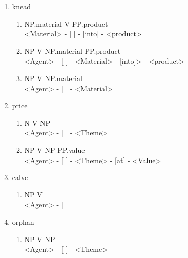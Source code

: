 \documentclass[11pt,a4paper,twocolumn]{article}
\begin{document}
\begin{enumerate}
			\item knead
				\begin{enumerate}
					\item NP.material V PP.product\\
					<Material> - [ ] - [into] - <product>
					
					\item NP V NP.material PP.product\\
					<Agent> - [ ] - <Material> - [into]> - <product>
					
					
					\item NP V NP.material\\
					<Agent> - [ ] - <Material>
					
				\end{enumerate}			
				
			\item price
				\begin{enumerate}
					\item N V NP\\
					<Agent> - [ ] - <Theme>
					
					\item NP V NP PP.value\\
					<Agent> - [ ] - <Theme> - [at] - <Value>
						
				\end{enumerate}		
				
			\item calve
				\begin{enumerate}
					\item NP V\\
					<Agent> - [ ]
				\end{enumerate}								
				
			\item orphan
				\begin{enumerate}
					\item NP V NP\\
					<Agent> - [ ] - <Theme>
						
				\end{enumerate}									
			
		\end{enumerate}
	
\end{document}
